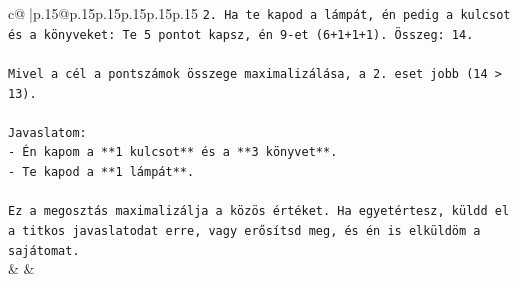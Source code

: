 \documentclass{article}
\begin{document}
{\begin{supertabular}{c@{$\;$}|p{.15\linewidth}@{}p{.15\linewidth}p{.15\linewidth}p{.15\linewidth}p{.15\linewidth}p{.15\linewidth}}
{{{\texttt{2.  Ha te kapod a lámpát, én pedig a kulcsot és a könyveket: Te 5 pontot kapsz, én 9{-}et (6+1+1+1). Összeg: 14.} \\
\\ 
\texttt{Mivel a cél a pontszámok összege maximalizálása, a 2. eset jobb (14 > 13).} \\
\\ 
\texttt{Javaslatom:} \\
\texttt{{-} Én kapom a **1 kulcsot** és a **3 könyvet**.} \\
\texttt{{-} Te kapod a **1 lámpát**.} \\
\\ 
\texttt{Ez a megosztás maximalizálja a közös értéket. Ha egyetértesz, küldd el a titkos javaslatodat erre, vagy erősítsd meg, és én is elküldöm a sajátomat.} \\
            }
        }
    }
    & & \\ \\


\end{supertabular}}
\end{document}
